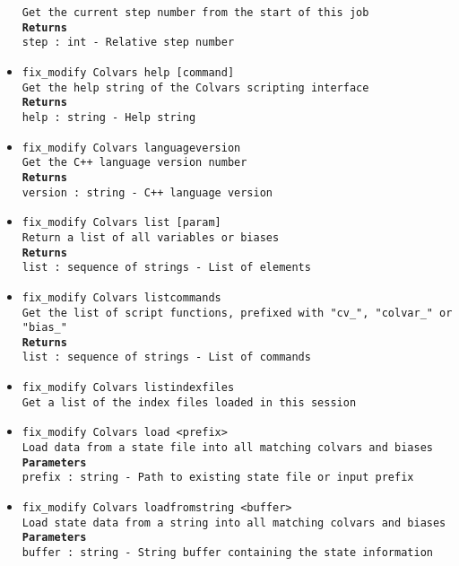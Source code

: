 \begin{itemize}
\texttt{Get the current step number from the start of this job}
\\
\texttt{\textbf{Returns}}
\\
\texttt{step : int - Relative step number}
\item \texttt{fix\_modify Colvars help [command]}
\\
\texttt{Get the help string of the Colvars scripting interface}
\\
\texttt{\textbf{Returns}}
\\
\texttt{help : string - Help string}
\item \texttt{fix\_modify Colvars languageversion}
\\
\texttt{Get the C++ language version number}
\\
\texttt{\textbf{Returns}}
\\
\texttt{version : string - C++ language version}
\item \texttt{fix\_modify Colvars list [param]}
\\
\texttt{Return a list of all variables or biases}
\\
\texttt{\textbf{Returns}}
\\
\texttt{list : sequence of strings - List of elements}
\item \texttt{fix\_modify Colvars listcommands}
\\
\texttt{Get the list of script functions, prefixed with "cv\_", "colvar\_" or "bias\_"}
\\
\texttt{\textbf{Returns}}
\\
\texttt{list : sequence of strings - List of commands}
\item \texttt{fix\_modify Colvars listindexfiles}
\\
\texttt{Get a list of the index files loaded in this session}
\item \texttt{fix\_modify Colvars load <prefix>}
\\
\texttt{Load data from a state file into all matching colvars and biases}
\\
\texttt{\textbf{Parameters}}
\\
\texttt{prefix : string - Path to existing state file or input prefix}
\item \texttt{fix\_modify Colvars loadfromstring <buffer>}
\\
\texttt{Load state data from a string into all matching colvars and biases}
\\
\texttt{\textbf{Parameters}}
\\
\texttt{buffer : string - String buffer containing the state information}

\end{itemize}
